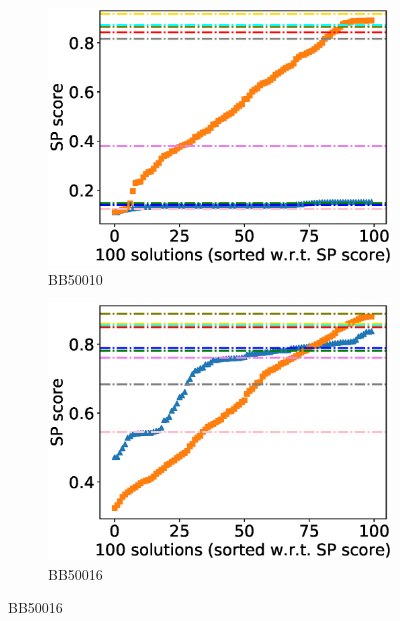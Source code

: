 \begin{figure}[!htbp]
\begin{adjustwidth}{-1cm}{-1cm}
		\begin{subfigure}{0.22\textwidth}
			\includegraphics[width=\columnwidth]{Figure/summary/precomputedInit/Balibase/BB50010_pairs_density_single_run_2}
			\caption{BB50010}
		\end{subfigure}
		\begin{subfigure}{0.22\textwidth}
			\includegraphics[width=\columnwidth]{Figure/summary/precomputedInit/Balibase/BB50016_pairs_density_single_run_2}
			\caption{BB50016}
		\end{subfigure}
		

\end{adjustwidth}
\end{figure}
